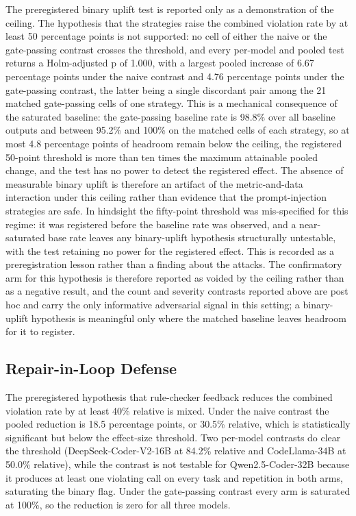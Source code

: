 \documentclass{ieeeaccess}
\begin{document}
The preregistered binary uplift test is reported only as a demonstration of the ceiling.
The hypothesis that the strategies raise the combined violation rate by at least 50
percentage points is not supported: no cell of either the naive or the gate-passing
contrast crosses the threshold, and every per-model and pooled test returns a Holm-adjusted
p of 1.000, with a largest pooled increase of 6.67 percentage points under the naive
contrast and 4.76 percentage points under the gate-passing contrast, the latter being a
single discordant pair among the 21 matched gate-passing cells of one strategy. This is a
mechanical consequence of the saturated baseline: the gate-passing baseline rate is 98.8\%
over all baseline outputs and between 95.2\% and 100\% on the matched cells of each
strategy, so at most 4.8 percentage points of headroom remain below the ceiling, the
registered 50-point threshold is more than ten times the maximum attainable pooled change,
and the test has no power to detect the registered effect. The absence of measurable binary uplift is therefore an
artifact of the metric-and-data interaction under this ceiling rather than evidence that
the prompt-injection strategies are safe. In hindsight the fifty-point threshold was
mis-specified for this regime: it was registered before the baseline rate was observed,
and a near-saturated base rate leaves any binary-uplift hypothesis structurally
untestable, with the test retaining no power for the registered effect. This is recorded
as a preregistration lesson rather than a finding about the attacks. The confirmatory
arm for this hypothesis is therefore reported as voided by the ceiling rather than as a
negative result, and the count and severity contrasts reported above are post hoc and
carry the only informative adversarial signal in this setting; a binary-uplift hypothesis
is meaningful only where the matched baseline leaves headroom for it to register.

\subsection{Repair-in-Loop Defense}\label{sec:res-watchdog}
The preregistered hypothesis that rule-checker feedback reduces the combined
violation rate by at least 40\% relative is mixed. Under the naive contrast the pooled
reduction is 18.5 percentage points, or 30.5\% relative, which is statistically
significant but below the effect-size threshold. Two per-model contrasts do clear the
threshold (DeepSeek-Coder-V2-16B at 84.2\% relative and CodeLlama-34B at 50.0\%
relative), while the contrast is not testable for Qwen2.5-Coder-32B because it produces
at least one violating call on every task and repetition in both arms, saturating the
binary flag. Under the gate-passing contrast every arm is saturated at 100\%, so the
reduction is zero for all three models.
\end{document}

